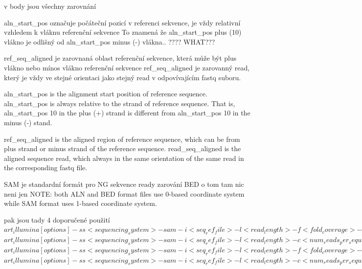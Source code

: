 \documentclass[czech,DP]{thesiskiv}
\begin{document}
		
v body jsou všechny zarovnání 
	    
	    aln\_start\_pos označuje počáteční pozicí v referenci sekvence, je vždy relativní vzhledem k vláknu referenční sekvence
	    To znamená že aln\_start\_pos plus (10) vlákno je odlišný od  aln\_start\_pos minus (-) vlákna.. ???? WHAT???
	    
		ref\_seq\_aligned je zarovnaná oblast referenční sekvence, která může být plus vlákno nebo mínos vlákno referenční sekvence
		ref\_seq\_aligned je zarovanný read, který je vždy ve stejné orientaci jako stejný read v odpovívajícím fastq suboru.  
		
		
			    
	    
	       	
		aln\_start\_pos is the alignment start position of reference sequence. aln\_start\_pos is always relative to the strand of reference sequence. That is, aln\_start\_pos 10 in the plus (+) strand is different from aln\_start\_pos 10 in the minus (‐) stand.  
	
		ref\_seq\_aligned is the aligned region of reference sequence, which can be from plus strand or minus strand of the reference sequence. 
		read\_seq\_aligned is the aligned sequence read, which always in the same orientation of the same read in the corresponding fastq file. 

SAM je standardní formát pro NG sekvence ready zarování
BED o tom tam nic neni jen 
NOTE: both ALN and BED format files use 0-based coordinate system while SAM format uses 1-based coordinate system.

pak jsou tady 4 doporučené použití
$art_illumina [options] -ss <sequencing_system> -sam -i <seq_ref_file> -l <read_length> -f <fold_coverage> -o <outfile_prefix>$
$art_illumina [options] -ss <sequencing_system> -sam -i <seq_ref_file> -l <read_length> -c <num_reads_per_sequence> -o <outfile_prefix>$
$art_illumina [options] -ss <sequencing_system> -sam -i <seq_ref_file> -l <read_length> -f <fold_coverage> -m <mean_fragsize> -s <std_fragsize> -o <outfile_prefix>$
$art_illumina [options] -ss <sequencing_system> -sam -i <seq_ref_file> -l <read_length> -c <num_reads_per_sequence> -m <mean_fragsize> -s <std_fragsize> -o <outfile_prefix>$
\end{document}
